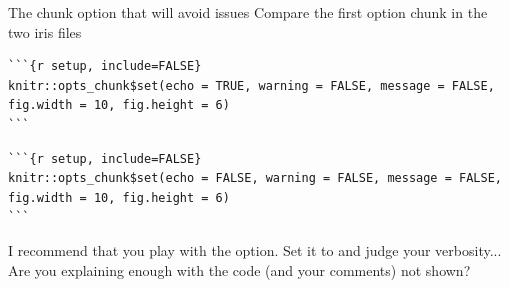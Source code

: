 \documentclass[aspectratio=169]{beamer}\usepackage[]{graphicx}\usepackage[]{xcolor}
\begin{document}
\begin{frame}[fragile]{The chunk option that will avoid issues}
Compare the first option chunk in the two iris files
\vfill
\begin{lstlisting}
```{r setup, include=FALSE}
knitr::opts_chunk$set(echo = TRUE, warning = FALSE, message = FALSE, fig.width = 10, fig.height = 6)
```\end{lstlisting}
\vfill
\begin{lstlisting}
```{r setup, include=FALSE}
knitr::opts_chunk$set(echo = FALSE, warning = FALSE, message = FALSE, fig.width = 10, fig.height = 6)
```\end{lstlisting}
\vfill
I recommend that you play with the  option. Set it to  and judge your verbosity... Are you explaining enough with the code (and your comments) not shown?
\end{frame}



\end{document}
